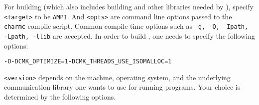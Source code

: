 \documentclass[10pt]{article}
\begin{document}
For building \ampi{} (which also includes building \charmpp{} and other
libraries needed by \ampi{}), specify \verb+<target>+ to be \verb+AMPI+. And
\verb+<opts>+ are command line options passed to the \verb+charmc+ compile
script.  Common compile time options such as \texttt{-g, -O, -Ipath, -Lpath,
-llib} are accepted. In order to build \ampi{}, one needs to specify the
following options:

\begin{alltt}
-O -DCMK_OPTIMIZE=1 -DCMK_THREADS_USE_ISOMALLOC=1
\end{alltt}

\verb+<version>+ depends on the machine, operating system, and the underlying
communication library one wants to use for running \ampi{} programs. Your
choice is determined by the following options.
\end{document}
